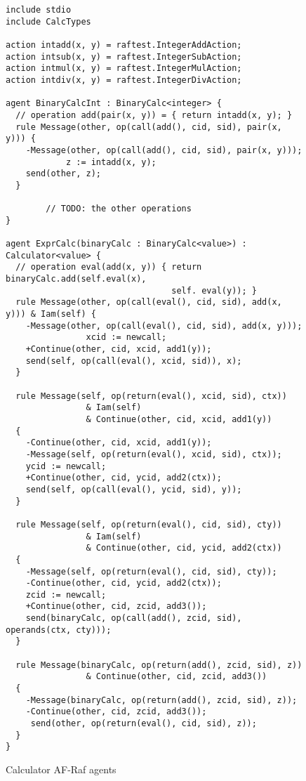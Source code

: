\documentclass[a4paper,12pt,oneside,fleqn]{book} %
\theoremstyle{plain}
\theoremstyle{definition}
\theoremstyle{remark}
\begin{document}
\begin{figure}\footnotesize %
\begin{verbatim}
include stdio
include CalcTypes

action intadd(x, y) = raftest.IntegerAddAction;
action intsub(x, y) = raftest.IntegerSubAction;
action intmul(x, y) = raftest.IntegerMulAction;
action intdiv(x, y) = raftest.IntegerDivAction;

agent BinaryCalcInt : BinaryCalc<integer> {
  // operation add(pair(x, y)) = { return intadd(x, y); }
  rule Message(other, op(call(add(), cid, sid), pair(x, y))) {
    -Message(other, op(call(add(), cid, sid), pair(x, y)));
            z := intadd(x, y);
    send(other, z);
  }
        
        // TODO: the other operations
}

agent ExprCalc(binaryCalc : BinaryCalc<value>) : Calculator<value> {
  // operation eval(add(x, y)) { return binaryCalc.add(self.eval(x), 
                                 self. eval(y)); }
  rule Message(other, op(call(eval(), cid, sid), add(x, y))) & Iam(self) {
    -Message(other, op(call(eval(), cid, sid), add(x, y)));
                xcid := newcall;
    +Continue(other, cid, xcid, add1(y));
    send(self, op(call(eval(), xcid, sid)), x);
  }
        
  rule Message(self, op(return(eval(), xcid, sid), ctx)) 
                & Iam(self) 
                & Continue(other, cid, xcid, add1(y)) 
  {
    -Continue(other, cid, xcid, add1(y));
    -Message(self, op(return(eval(), xcid, sid), ctx));
    ycid := newcall;
    +Continue(other, cid, ycid, add2(ctx));
    send(self, op(call(eval(), ycid, sid), y));
  }
        
  rule Message(self, op(return(eval(), cid, sid), cty))
                & Iam(self)
                & Continue(other, cid, ycid, add2(ctx))
  {
    -Message(self, op(return(eval(), cid, sid), cty));
    -Continue(other, cid, ycid, add2(ctx));
    zcid := newcall;
    +Continue(other, cid, zcid, add3());
    send(binaryCalc, op(call(add(), zcid, sid), operands(ctx, cty)));
  }
        
  rule Message(binaryCalc, op(return(add(), zcid, sid), z))
                & Continue(other, cid, zcid, add3())
  {
    -Message(binaryCalc, op(return(add(), zcid, sid), z));
    -Continue(other, cid, zcid, add3());
     send(other, op(return(eval(), cid, sid), z));
  }
}

\end{verbatim}
\caption{Calculator AF-Raf agents}
\label{fig:AF-Raf-calculator}
\end{figure} %
\end{document}
